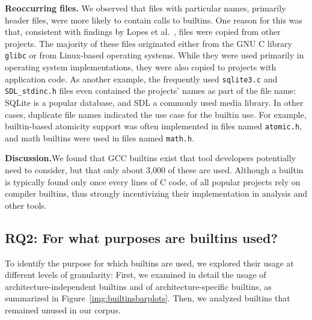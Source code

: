 \documentclass[sigconf,screen]{acmart}
\renewcommand{\paragraph}[1]{\textbf{#1}}
\newcommand\code[1]{\texttt{#1}}
\newcommand\approxnumberusedbuiltins{3,000} %
\begin{document}
\paragraph{Reoccurring files.}
We observed that files with particular names, primarily header files, were more likely to contain calls to builtins.
One reason for this was that, consistent with findings by Lopes et al.~\cite{duplicates}, files were copied from other projects.
The majority of these files originated either from the GNU C library \code{glibc} or from Linux-based operating systems.
While they were used primarily in operating system implementations, they were also copied to projects with application code.
As another example, the frequently used \code{sqlite3.c} and \code{SDL\_stdinc.h} files even contained the projects' names as part of the file name: SQLite is a popular database, and SDL a commonly used media library.
In other cases, duplicate file names indicated the use case for the builtin use.
For example, builtin-based atomicity support was often implemented in files named \code{atomic.h}, and math builtins were used in files named \code{math.h}.

\paragraph{Discussion.}We found that \nrTotalTerms{} GCC builtins exist that tool developers potentially need to consider, but that only about \approxnumberusedbuiltins{} of these are used.
Although a builtin is typically found only once every \medianBuiltinEveryXLOC{} lines of C code, \percentageProjectsWithBuiltins{} of all popular projects rely on compiler builtins, thus strongly incentivizing their implementation in analysis and other tools.


\subsection{RQ2: For what purposes are builtins used?}
\label{sec:usedbuiltins}

To identify the purpose for which builtins are used, we explored their usage at different levels of granularity:
First, we examined in detail the usage of architecture-independent builtins and of architecture-specific builtins, as summarized in Figure~\ref{img:builtinsbarplots}.
Then, we analyzed builtins that remained unused in our corpus.
\end{document}
